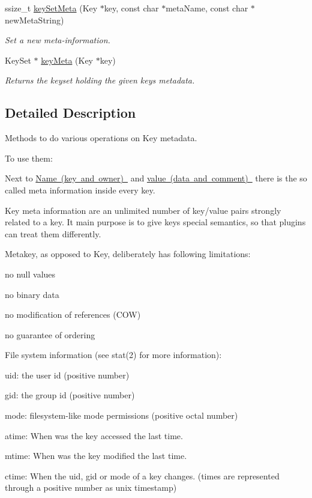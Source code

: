 \begin{DoxyCompactItemize}
ssize\+\_\+t \mbox{\hyperlink{group__keymeta_gae1f15546b234ffb6007d8a31178652b9}{key\+Set\+Meta}} (Key $\ast$key, const char $\ast$meta\+Name, const char $\ast$new\+Meta\+String)
\begin{DoxyCompactList}\small\item\em Set a new meta-\/information. \end{DoxyCompactList}\item 
Key\+Set $\ast$ \mbox{\hyperlink{group__keymeta_ga11706f1753e67933f7cffc5c0345cd29}{key\+Meta}} (Key $\ast$key)
\begin{DoxyCompactList}\small\item\em Returns the keyset holding the given key\textquotesingle{}s metadata. \end{DoxyCompactList}\end{DoxyCompactItemize}


\subsection{Detailed Description}
Methods to do various operations on Key metadata. 

To use them\+: 
\begin{DoxyCode}{0}
\DoxyCodeLine{\textcolor{preprocessor}{\#include <kdb.h>}}
\end{DoxyCode}


Next to \mbox{\hyperlink{group__keyname}{Name (key and owner) }} and \mbox{\hyperlink{group__keyvalue}{value (data and comment) }} there is the so called meta information inside every key.

Key meta information are an unlimited number of key/value pairs strongly related to a key. It main purpose is to give keys special semantics, so that plugins can treat them differently.

Metakey, as opposed to Key, deliberately has following limitations\+:
\begin{DoxyItemize}
\item no null values
\item no binary data
\item no modification of references (C\+OW)
\item no guarantee of ordering
\end{DoxyItemize}

File system information (see stat(2) for more information)\+:
\begin{DoxyItemize}
\item uid\+: the user id (positive number)
\item gid\+: the group id (positive number)
\item mode\+: filesystem-\/like mode permissions (positive octal number)
\item atime\+: When was the key accessed the last time.
\item mtime\+: When was the key modified the last time.
\item ctime\+: When the uid, gid or mode of a key changes. (times are represented through a positive number as unix timestamp)
\end{DoxyItemize}

